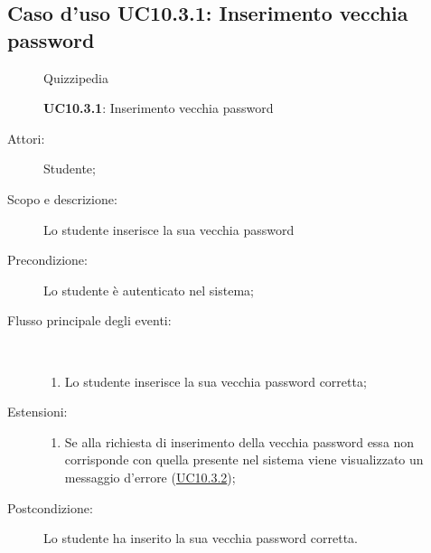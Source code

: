 \subsection{Caso d'uso UC10.3.1: Inserimento vecchia password}
\begin{figure}[H]
	\centering
	\begin{resizedtikzpicture}{\textwidth}
		\begin{umlsystem}[x=0, fill=lightgray!20]{Quizzipedia}
		\end{umlsystem}
	\end{resizedtikzpicture}
	\caption{\textbf{UC10.3.1}: Inserimento vecchia password}
	\label{UC10.3.1}
\end{figure}
\begin{description}
	\item[Attori:] Studente;
	\item[Scopo e descrizione:] Lo studente inserisce la sua vecchia password
	\item[Precondizione:] Lo studente è autenticato nel sistema;
	
	\item[Flusso principale degli eventi:] \ 
	\begin{enumerate}
		\item Lo studente inserisce la sua vecchia password corretta;
		
	\end{enumerate}
	\item[Estensioni:]
	\begin{enumerate}
		\item Se alla richiesta di inserimento della vecchia password essa non corrisponde con quella presente nel sistema viene visualizzato un messaggio d'errore (\hyperlink{UC10.3.2}{UC10.3.2});
		
	\end{enumerate}
	\item[Postcondizione:] Lo studente ha inserito la sua vecchia password corretta.
\end{description}
\hypertarget{UC10.3.2}{}
